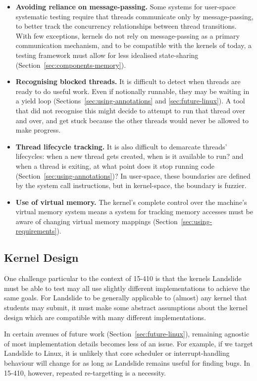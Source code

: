 \begin{itemize}
	\item {\bf Avoiding reliance on message-passing.} Some systems for user-space systematic testing require that threads communicate only by message-passing, to better track the concurrency relationships between thread transitions\cite{dbug-ssv}. With few exceptions\cite{barrelfish}, kernels do not rely on message-passing as a primary communication mechanism, and to be compatible with the kernels of today, a testing framework must allow for less idealised state-sharing (Section~\ref{sec:components-memory}).
	\item {\bf Recognising blocked threads.} It is difficult to detect when threads are ready to do useful work. Even if notionally runnable, they may be waiting in a yield loop (Sections~\ref{sec:using-annotations} and \ref{sec:future-linux}). A tool that did not recognise this might decide to attempt to run that thread over and over, and get stuck because the other threads would never be allowed to make progress.
	\item {\bf Thread lifecycle tracking.} It is also difficult to demarcate threads' lifecycles: when a new thread gets created, when is it available to run? and when a thread is exiting, at what point does it stop running code (Section~\ref{sec:using-annotations})? In user-space, these boundaries are defined by the system call instructions, but in kernel-space, the boundary is fuzzier.
	\item {\bf Use of virtual memory.} The kernel's complete control over the machine's virtual memory system means a system for tracking memory accesses must be aware of changing virtual memory mappings (Section~\ref{sec:using-requirements}).
\end{itemize}

\subsection{Kernel Design}

One challenge particular to the context of 15-410 is that the kernels Landslide must be able to test may all use slightly different implementations to achieve the same goals. For Landslide to be generally applicable to (almost) any kernel that students may submit, it must make some abstract assumptions about the kernel design which are compatible with many different implementations.

In certain avenues of future work (Section~\ref{sec:future-linux}), remaining agnostic of most implementation details becomes less of an issue. For example, if we target Landslide to Linux, it is unlikely that core scheduler or interrupt-handling behaviour will change for as long as Landslide remains useful for finding bugs. In 15-410, however, repeated re-targetting is a necessity.

